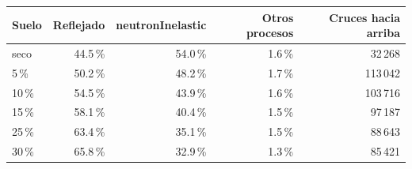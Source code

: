 \begin{tabular}{lrrrr}
\toprule
Suelo & Reflejado & neutronInelastic & Otros procesos & Cruces hacia arriba \\
\midrule
seco & 44.5\,\% & 54.0\,\% & 1.6\,\% & 32\,268 \\
5\,\% & 50.2\,\% & 48.2\,\% & 1.7\,\% & 113\,042 \\
10\,\% & 54.5\,\% & 43.9\,\% & 1.6\,\% & 103\,716 \\
15\,\% & 58.1\,\% & 40.4\,\% & 1.5\,\% & 97\,187 \\
25\,\% & 63.4\,\% & 35.1\,\% & 1.5\,\% & 88\,643 \\
30\,\% & 65.8\,\% & 32.9\,\% & 1.3\,\% & 85\,421 \\
\bottomrule
\end{tabular}

